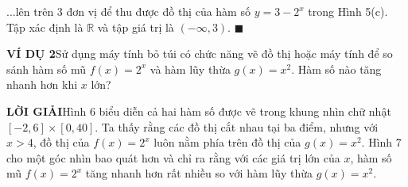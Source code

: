 \begin{minipage}[t]{0.708\textwidth}
    \fontsize{9.3pt}{13.2pt}\selectfont
    \vspace{0pt}
    \noindent ...lên trên 3 đơn vị để thu được đồ thị của hàm số $y = 3 - 2^x$ trong Hình 5(c). Tập xác định là $\mathbb{R}$ và tập giá trị là $(-\infty, 3)$. \hfill{\color{stewartcyan}$\blacksquare$}

    \vspace{1.2em}
    \noindent\textbf{\textsf{\color{stewartcyan}VÍ DỤ 2}}\quad Sử dụng máy tính bỏ túi có chức năng vẽ đồ thị hoặc máy tính để so sánh hàm số mũ $f(x) = 2^x$ và hàm lũy thừa $g(x) = x^2$. Hàm số nào tăng nhanh hơn khi $x$ lớn?

    \vspace{0.6em}
    \noindent\textbf{\textsf{\color{stewartcyan}LỜI GIẢI}}\quad Hình 6 biểu diễn cả hai hàm số được vẽ trong khung nhìn chữ nhật $[-2, 6] \times [0, 40]$. Ta thấy rằng các đồ thị cắt nhau tại ba điểm, nhưng với $x > 4$, đồ thị của $f(x) = 2^x$ luôn nằm phía trên đồ thị của $g(x) = x^2$. Hình 7 cho một góc nhìn bao quát hơn và chỉ ra rằng với các giá trị lớn của $x$, hàm số mũ $f(x) = 2^x$ tăng nhanh hơn rất nhiều so với hàm lũy thừa $g(x) = x^2$.

    \vspace{0.8em}
    \begin{center}
        \par\vspace{3pt}
    \end{center}


\end{minipage}
